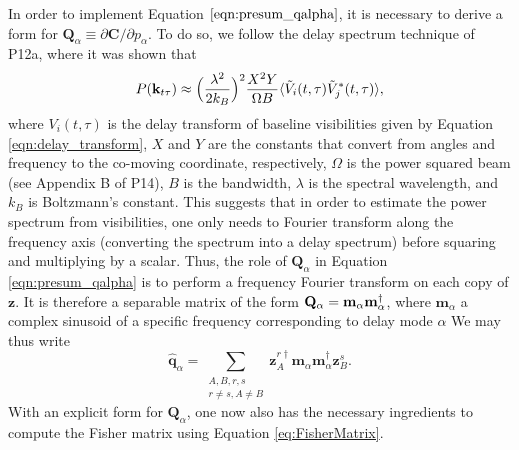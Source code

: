\documentclass[twocolumn,numberedappendix]{emulateapj} \shorttitle{New Limits on the 21 cm Power Spectrum at $z=8.4$}
\newcommand{\qhat}{\hat{\mathbf{q}}}
\begin{document}
In order to implement Equation $\eqref{eqn:presum_qalpha}$, it is necessary to derive a form for
$\mathbf{Q}_\alpha \equiv \partial \mathbf{C} / \partial p_\alpha$. To do so, we follow the delay
spectrum technique of P12a, where it was shown that
\begin{equation}\label{eqn:delay_pspec}
    P(\mathbf{k}_{t\tau}) \approx
\Big(\frac{\lambda^{2}}{2k_{B}}\Big)^{2}\frac{X^{2}Y}{\Omega
B}\expval{\tilde{V}_{i}(t,\tau)\tilde{V}_{j}^{*}(t,\tau)},
\end{equation}
where $V_{i}(t,\tau)$ is the delay transform of baseline visibilities given by Equation \eqref{eqn:delay_transform}, $X$ and
$Y$ are the constants that convert from angles and frequency to the co-moving
coordinate, respectively, $\Omega$ is the power squared beam (see Appendix B of
P14), $B$ is the bandwidth, $\lambda$ is the spectral wavelength, and $k_{B}$ is Boltzmann's constant.
This suggests that in order to estimate the power spectrum from visibilities, one only needs
to Fourier transform along the frequency axis (converting the spectrum into a delay spectrum)
before squaring and multiplying by a scalar. Thus, the role of $\mathbf{Q}_\alpha$ in Equation \eqref{eqn:presum_qalpha} is to perform a frequency Fourier transform on each copy of
$\mathbf{z}$. It is therefore a separable matrix of the form $\mathbf{Q}_{\alpha} =
\mathbf{m}_{\alpha}\mathbf{m}_{\alpha}^{\dagger}$, where $\mathbf{m}_{\alpha}$ a
complex sinusoid of a specific frequency corresponding to delay mode $\alpha$
We may thus write
\begin{equation}
    \qhat_{\alpha} =
\sum_{\substack{A,B,r,s\\r\ne{s},A\ne{B}}}\mathbf{z}^{r\dagger}_{A}\mathbf{m}_{\alpha}\mathbf{m}_{\alpha}^{\dagger} \mathbf{z}^{s}_{B}.
\end{equation}
With an explicit form for $\mathbf{Q}_\alpha$, one now also has the necessary ingredients
to compute the Fisher matrix using Equation \eqref{eq:FisherMatrix}.
\end{document}
